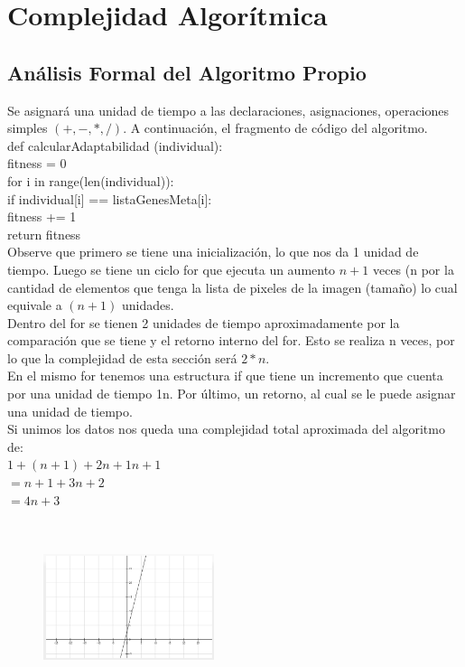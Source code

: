 \documentclass[letterpaper, 10 pt, conference]{ieeeconf}  %
\begin{document}
\section{\textbf{Complejidad Algor\'itmica}}

\subsection{\textbf{An\'alisis Formal del Algoritmo Propio}}

\setlength{\parindent}{1cm}Se asignar\'a una unidad de tiempo a las declaraciones, asignaciones, operaciones simples $(+, -, *, /)$. A continuaci\'on, el fragmento de c\'odigo del algoritmo.\\ 

def calcularAdaptabilidad (individual):\\ 
\indent\indent fitness = 0\\ 
\indent\indent for i in range(len(individual)):\\ 
\indent\indent\indent if individual[i] == listaGenesMeta[i]: \\ 
\indent\indent\indent\indent fitness += 1\\ 
\indent\indent return fitness \\ 

\indent Observe que primero se tiene una inicializaci\'on, lo que nos da 1 unidad de tiempo. Luego se tiene un ciclo for que ejecuta un aumento $n + 1$ veces (n por la cantidad de elementos que tenga la lista de pixeles de la imagen (tama\~no) lo cual equivale a $(n+1)$ unidades.\\ 
\indent Dentro del for se tienen 2 unidades de tiempo aproximadamente por la comparaci\'on que se tiene y el retorno interno del for. Esto se realiza n veces, por lo que la complejidad de esta secci\'on será $2*n$.\\ 
\indent En el mismo for tenemos una estructura if que tiene un incremento que cuenta por una unidad de tiempo 1n. Por \'ultimo, un retorno, al cual se le puede asignar una unidad de tiempo.\\ 
\indent Si unimos los datos nos queda una complejidad total aproximada del algoritmo de: \\ 

\indent\indent $1+(n+1)+2n+ 1n+1$\\ 
\indent\indent $=n+1+3n +2$\\ 
\indent\indent $=4n+3$

\begin{figure}[h]
\centering
\includegraphics[width=5cm, height=5cm]{GraficaPropia}
\end{figure}
\end{document}
